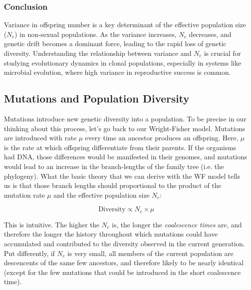 \documentclass[10pt,a4paper]{scrbook}
\begin{document}
\subsubsection{Conclusion}

Variance in offspring number is a key determinant of the effective population size (\(N_e\)) in non-sexual populations. As the variance increases, \(N_e\) decreases, and genetic drift becomes a dominant force, leading to the rapid loss of genetic diversity. Understanding the relationship between variance and \(N_e\) is crucial for studying evolutionary dynamics in clonal populations, especially in systems like microbial evolution, where high variance in reproductive success is common.


\subsection{Mutations and Population Diversity}

Mutations introduce new genetic diversity into a population. To be precise in our thinking about this process, let's go back to our Wright-Fisher model. Mutations are introduced with rate \( \mu \) every time an ancestor produces an offspring. Here, \( \mu \) is the rate at which offspring differentiate from their parents. If the organisms had DNA, those differences would be manifested in their genomes, and mutations would lead to an increase in the branch-lengths of the family tree (i.e. the phylogeny). What the basic theory that we can derive with the WF model tells us is that those branch lengths should proportional to the product of the mutation rate \( \mu \) and the effective population size \(N_e\):

\[
\text{Diversity} \propto N_e \times \mu
\]

This is intuitive. The higher the $N_e$ is, the longer the \emph{coalescence times} are, and therefore the longer the history throughout which mutations could have accumulated and contributed to the diversity observed in the current generation. Put differently, if $N_e$ is very small, all members of the current population are descencents of the same few ancestors, and therefore likely to be nearly identical (except for the few mutations that could be introduced in the short coalescence time).
\end{document}
